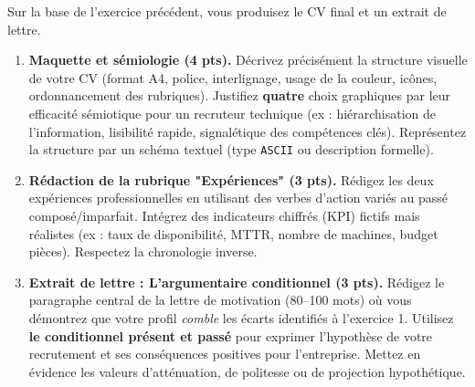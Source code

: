\documentclass[11pt]{article}
\begin{document}
\begin{exercice}
Sur la base de l'exercice précédent, vous produisez le CV final et un extrait de lettre.

\begin{enumerate}
    \item \textbf{Maquette et sémiologie (4 pts).} Décrivez précisément la structure visuelle de votre CV (format A4, police, interlignage, usage de la couleur, icônes, ordonnancement des rubriques). Justifiez \textbf{quatre} choix graphiques par leur efficacité sémiotique pour un recruteur technique (ex : hiérarchisation de l'information, lisibilité rapide, signalétique des compétences clés). Représentez la structure par un schéma textuel (type \texttt{ASCII} ou description formelle).
    \item \textbf{Rédaction de la rubrique "Expériences" (3 pts).} Rédigez les deux expériences professionnelles en utilisant des verbes d'action variés au passé composé/imparfait. Intégrez des indicateurs chiffrés (KPI) fictifs mais réalistes (ex : taux de disponibilité, MTTR, nombre de machines, budget pièces). Respectez la chronologie inverse.
    \item \textbf{Extrait de lettre : L'argumentaire conditionnel (3 pts).} Rédigez le paragraphe central de la lettre de motivation (80--100 mots) où vous démontrez que votre profil \textit{comble} les écarts identifiés à l'exercice 1. Utilisez \textbf{le conditionnel présent et passé} pour exprimer l'hypothèse de votre recrutement et ses conséquences positives pour l'entreprise. Mettez en évidence les valeurs d'atténuation, de politesse ou de projection hypothétique.
\end{enumerate}
\end{exercice}
\end{document}
